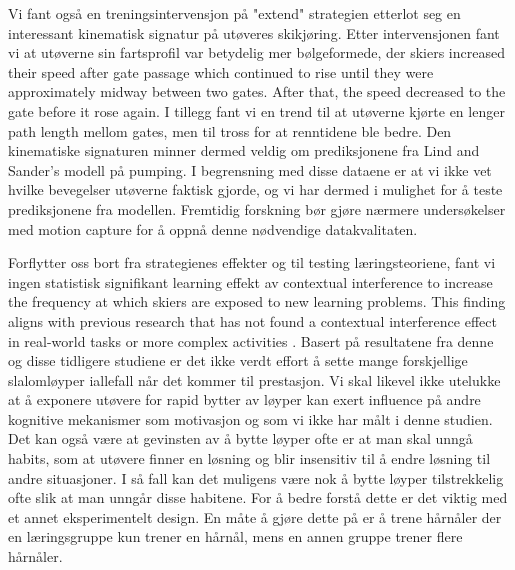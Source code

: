 Vi fant også en treningsintervensjon på "extend" strategien etterlot seg en interessant kinematisk signatur på utøveres skikjøring. Etter intervensjonen fant vi at utøverne sin fartsprofil var betydelig mer bølgeformede, der skiers increased their speed after gate passage which continued to rise until they were approximately midway between two gates. After that, the speed decreased to the gate before it rose again. I tillegg fant vi en trend til at utøverne kjørte en lenger path length mellom gates, men til tross for at renntidene ble bedre. Den kinematiske signaturen minner dermed veldig om prediksjonene fra Lind and Sander's modell på pumping. I begrensning med disse dataene er at vi ikke vet hvilke bevegelser utøverne faktisk gjorde, og vi har dermed i mulighet for å teste prediksjonene fra modellen. Fremtidig forskning bør gjøre nærmere undersøkelser med motion capture for å oppnå denne nødvendige datakvalitaten.

Forflytter oss bort fra strategienes effekter og til testing læringsteoriene, fant vi ingen statistisk signifikant learning effekt av contextual interference to increase the frequency at which skiers are exposed to new learning problems. This finding aligns with previous research that has not found a contextual interference effect in real-world tasks or more complex activities \cite{brady_theoretical_1998, barreiros_contextual_2007, wulf_principles_2002}. Basert på resultatene fra denne og disse tidligere studiene er det ikke verdt effort å sette mange forskjellige slalomløyper iallefall når det kommer til prestasjon. Vi skal likevel ikke utelukke at å exponere utøvere for rapid bytter av løyper kan exert influence på andre kognitive mekanismer som motivasjon og som vi ikke har målt i denne studien. Det kan også være at gevinsten av å bytte løyper ofte er at man skal unngå habits, som at utøvere finner en løsning og blir insensitiv til å endre løsning til andre situasjoner. I så fall kan det muligens være nok å bytte løyper tilstrekkelig ofte slik at man unngår disse habitene. For å bedre forstå dette er det viktig med et annet eksperimentelt design. En måte å gjøre dette på er å trene hårnåler der en læringsgruppe kun trener en hårnål, mens en annen gruppe trener flere hårnåler. 















